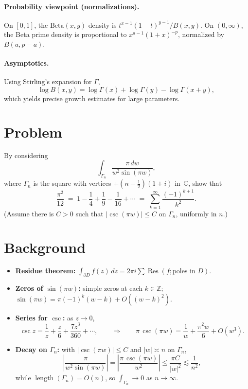 \documentclass[12pt,a4paper]{article}
\newcommand{\C}{\mathbb{C}}
\begin{document}
\paragraph{Probability viewpoint (normalizations).}
On $[0,1]$, the $\mathrm{Beta}(x,y)$ density is $t^{x-1}(1-t)^{y-1}/B(x,y)$.
On $(0,\infty)$, the Beta prime density is proportional to $x^{a-1}(1+x)^{-p}$, normalized by $B(a,p-a)$.

\paragraph{Asymptotics.}
Using Stirling’s expansion for $\Gamma$,
\[
\log B(x,y)=\log\Gamma(x)+\log\Gamma(y)-\log\Gamma(x+y),
\]
which yields precise growth estimates for large parameters.

\section*{Problem}
By considering
\[
\int_{\Gamma_n} \frac{\pi\,dw}{w^{2}\sin(\pi w)},
\]
where $\Gamma_n$ is the square with vertices $\pm(n+\tfrac12)(1\pm i)$ in~$\C$, show that
\[
\frac{\pi^2}{12}
\;=\;
1-\frac14+\frac19-\frac1{16}+\cdots
\;=\;
\sum_{k=1}^{\infty}\frac{(-1)^{k+1}}{k^{2}}.
\]
(Assume there is $C>0$ such that $|\csc(\pi w)|\le C$ on $\Gamma_n$, uniformly in $n$.)

\section*{Background}
\begin{itemize}
	\item \textbf{Residue theorem:} $\displaystyle \int_{\partial D} f(z)\,dz=2\pi i\sum \operatorname{Res}(f;\text{poles in }D)$.
	\item \textbf{Zeros of $\sin(\pi w)$:} simple zeros at each $k\in\mathbb Z$; $\sin(\pi w)=\pi(-1)^k(w-k)+O((w-k)^2)$.
	\item \textbf{Series for $\csc$:} as $z\to0$,
	\[
	\csc z=\frac1{z}+\frac{z}{6}+\frac{7z^{3}}{360}+\cdots,
	\qquad
	\Rightarrow\qquad
	\pi\,\csc(\pi w)=\frac1{w}+\frac{\pi^{2}w}{6}+O(w^{3}).
	\]
	\item \textbf{Decay on $\Gamma_n$:} with $|\csc(\pi w)|\le C$ and $|w|\asymp n$ on $\Gamma_n$,
	\[
	\left|\frac{\pi}{w^{2}\sin(\pi w)}\right|
	=\left|\frac{\pi\,\csc(\pi w)}{w^{2}}\right|
	\le \frac{\pi C}{|w|^{2}}
	\lesssim \frac{1}{n^{2}},
	\]
	while $\operatorname{length}(\Gamma_n)=O(n)$, so $\int_{\Gamma_n}\to0$ as $n\to\infty$.
\end{itemize}
\end{document}
